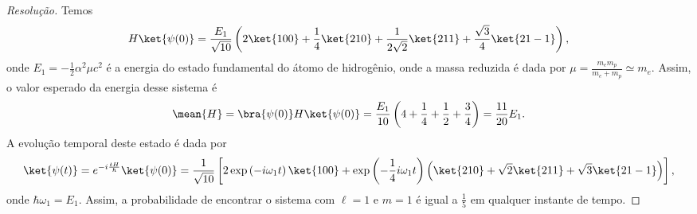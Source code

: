\begin{proof}[Resolução]
    Temos
    \begin{equation*}
        H\ket{\psi(0)} = \frac{E_1}{\sqrt{10}} \left(2\ket{100} + \frac14 \ket{210} + \frac{1}{2\sqrt{2}}\ket{211} + \frac{\sqrt{3}}{4}\ket{21-1}\right),
    \end{equation*}
    onde \(E_1 = - \frac12 \alpha^2 \mu c^2\) é a energia do estado fundamental do átomo de hidrogênio, onde a massa reduzida é dada por \(\mu = \frac{m_e m_p}{m_e + m_p} \simeq m_e\). Assim, o valor esperado da energia desse sistema é
    \begin{equation*}
        \mean{H} = \bra{\psi(0)}H\ket{\psi(0)} = \frac{E_1}{10}\left(4 + \frac14 + \frac12 + \frac34\right) = \frac{11}{20}E_1.
    \end{equation*}
    A evolução temporal deste estado é dada por
    \begin{equation*}
        \ket{\psi(t)} = e^{-i\frac{tH}{\hbar}} \ket{\psi(0)} = \frac{1}{\sqrt{10}} \left[2 \exp\left(-i\omega_1 t\right)\ket{100} + \exp\left(-\frac14i\omega_1 t\right)\left(\ket{210} + \sqrt{2} \ket{211} + \sqrt{3}\ket{21-1}\right)\right],
    \end{equation*}
    onde \(\hbar \omega_1 = E_1\). Assim, a probabilidade de encontrar o sistema com \(\ell = 1\) e \(m = 1\) é igual a \(\frac15\) em qualquer instante de tempo.


\end{proof}
